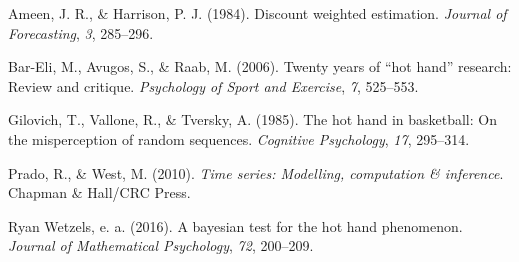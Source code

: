 \documentclass[12pt,twoside]{dukestatscithesis}
\theoremstyle{definition}
\theoremstyle{definition}
\theoremstyle{definition}
\theoremstyle{remark}
\begin{document}
\hypertarget{ref-ameen84}{}
Ameen, J. R., \& Harrison, P. J. (1984). Discount weighted estimation.
\emph{Journal of Forecasting}, \emph{3}, 285--296.

\hypertarget{ref-bareli06}{}
Bar-Eli, M., Avugos, S., \& Raab, M. (2006). Twenty years of ``hot
hand'' research: Review and critique. \emph{Psychology of Sport and
Exercise}, \emph{7}, 525--553.

\hypertarget{ref-gilovich85}{}
Gilovich, T., Vallone, R., \& Tversky, A. (1985). The hot hand in
basketball: On the misperception of random sequences. \emph{Cognitive
Psychology}, \emph{17}, 295--314.

\hypertarget{ref-west10}{}
Prado, R., \& West, M. (2010). \emph{Time series: Modelling, computation
\& inference}. Chapman \& Hall/CRC Press.

\hypertarget{ref-wetzels16}{}
Ryan Wetzels, e. a. (2016). A bayesian test for the hot hand phenomenon.
\emph{Journal of Mathematical Psychology}, \emph{72}, 200--209.


\end{document}
